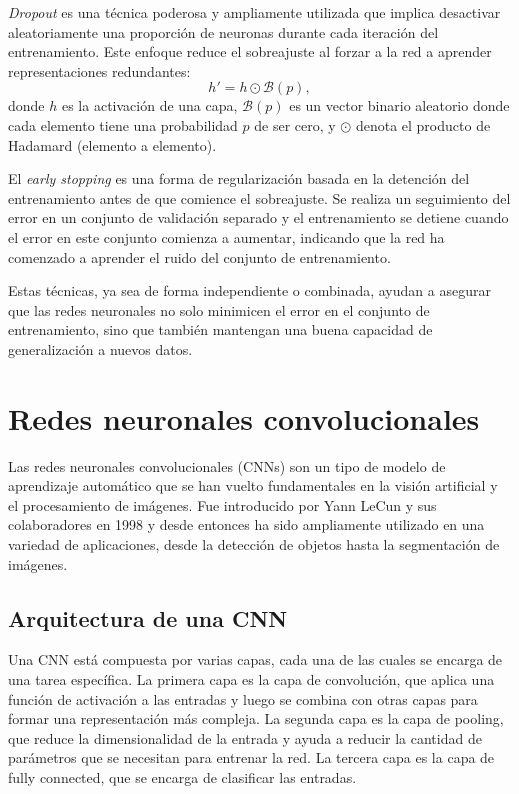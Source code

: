 \textit{Dropout} es una técnica poderosa y ampliamente utilizada que implica desactivar aleatoriamente una proporción de neuronas durante cada iteración del entrenamiento. Este enfoque reduce el sobreajuste al forzar a la red a aprender representaciones redundantes:
\begin{equation}
	h' = h \odot \mathcal{B}(p),
\end{equation}
donde $h$ es la activación de una capa, $\mathcal{B}(p)$ es un vector binario aleatorio donde cada elemento tiene una probabilidad $p$ de ser cero, y $\odot$ denota el producto de Hadamard (elemento a elemento).

El \textit{early stopping} es una forma de regularización basada en la detención del entrenamiento antes de que comience el sobreajuste. Se realiza un seguimiento del error en un conjunto de validación separado y el entrenamiento se detiene cuando el error en este conjunto comienza a aumentar, indicando que la red ha comenzado a aprender el ruido del conjunto de entrenamiento.

Estas técnicas, ya sea de forma independiente o combinada, ayudan a asegurar que las redes neuronales no solo minimicen el error en el conjunto de entrenamiento, sino que también mantengan una buena capacidad de generalización a nuevos datos.


\section{Redes neuronales convolucionales}

Las redes neuronales convolucionales (CNNs) son un tipo de modelo de aprendizaje automático que se han vuelto fundamentales en la visión artificial y el procesamiento de imágenes. Fue introducido por Yann LeCun y sus colaboradores en 1998 y desde entonces ha sido ampliamente utilizado en una variedad de aplicaciones, desde la detección de objetos hasta la segmentación de imágenes.

\subsection{Arquitectura de una CNN}

Una CNN está compuesta por varias capas, cada una de las cuales se encarga de una tarea específica. La primera capa es la capa de convolución, que aplica una función de activación a las entradas y luego se combina con otras capas para formar una representación más compleja. La segunda capa es la capa de pooling, que reduce la dimensionalidad de la entrada y ayuda a reducir la cantidad de parámetros que se necesitan para entrenar la red. La tercera capa es la capa de fully connected, que se encarga de clasificar las entradas.

